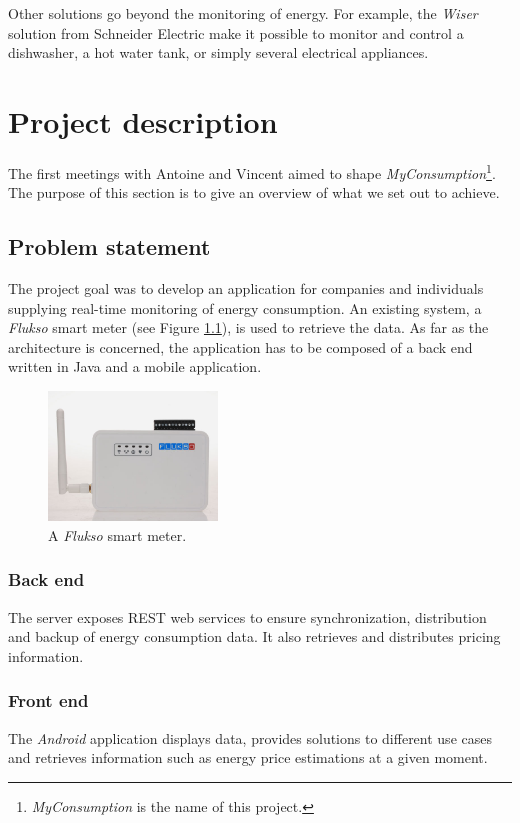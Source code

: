 \documentclass[a4paper, oneside, 11pt]{book}
\begin{document}
Other solutions go beyond the monitoring of energy. For example, the \textit{Wiser} solution from Schneider Electric make it possible to monitor and control a dishwasher, a hot water tank, or simply several electrical appliances.

\chapter{Project description}
The first meetings with Antoine and Vincent aimed to shape \textit{MyConsumption}\footnote{\textit{MyConsumption} is the name of this project.}. The purpose of this section is to give an overview of what we set out to achieve.

\section{Problem statement}
The project goal was to develop an application for companies and individuals supplying real-time monitoring of energy consumption. An existing system, a \textit{Flukso} smart meter (see Figure \ref{fig:flukso}), is used to retrieve the data. As far as the architecture is concerned, the application has to be composed of a back end written in Java and a mobile application.

\begin{figure}[htbp]
	\centerline{\includegraphics[width=0.4\textwidth]{flukso.png}}
	\caption{A \textit{Flukso} smart meter.}
	\label{fig:flukso}
\end{figure}

\subsection{Back end}
The server exposes REST web services to ensure synchronization, distribution and backup of energy consumption data. It also retrieves and distributes pricing information.

\subsection{Front end}
The \textit{Android} application displays data, provides solutions to different use cases and retrieves information such as energy price estimations at a given moment.
\end{document}
